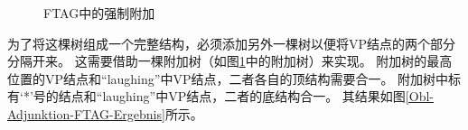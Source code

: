\begin{figure}
\caption{\label{Obl-Adjunktion-FTAG}FTAG中的强制附加}
\end{figure}%
为了将这棵树组成一个完整结构，必须添加另外一棵树以便将VP结点的两个部分分隔开来。
这需要借助一棵附加树（如图\ref{Obl-Adjunktion-FTAG}中的附加树）来实现。
附加树的最高位置的VP结点和``laughing''中VP结点，二者各自的顶结构需要合一。
附加树中标有`*'号的结点和``laughing''中VP结点，二者的底结构合一。
其结果如图\vref{Obl-Adjunktion-FTAG-Ergebnis}所示。
